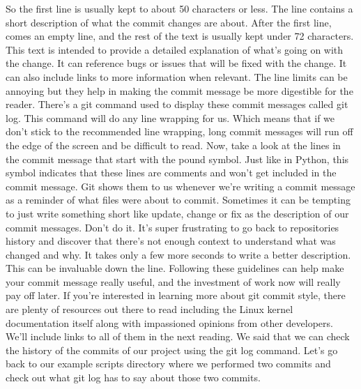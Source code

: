 	So the first line is usually kept to about 50 characters or less. The line contains a short description of what the commit changes are about. After the first line, comes an empty line, and the rest of the text is usually kept under 72 characters. This text is intended to provide a detailed explanation of what's going on with the change. It can reference bugs or issues that will be fixed with the change. It can also include links to more information when relevant. The line limits can be annoying but they help in making the commit message be more digestible for the reader. There's a git command used to display these commit messages called git log. This command will do any line wrapping for us. Which means that if we don't stick to the recommended line wrapping, long commit messages will run off the edge of the screen and be difficult to read. Now, take a look at the lines in the commit message that start with the pound symbol. Just like in Python, this symbol indicates that these lines are comments and won't get included in the commit message. Git shows them to us whenever we're writing a commit message as a reminder of what files were about to commit. Sometimes it can be tempting to just write something short like update, change or fix as the description of our commit messages. Don't do it. It's super frustrating to go back to repositories history and discover that there's not enough context to understand what was changed and why. It takes only a few more seconds to write a better description. This can be invaluable down the line. Following these guidelines can help make your commit message really useful, and the investment of work now will really pay off later. If you're interested in learning more about git commit style, there are plenty of resources out there to read including the Linux kernel documentation itself along with impassioned opinions from other developers. We'll include links to all of them in the next reading. We said that we can check the history of the commits of our project using the git log command. Let's go back to our example scripts directory where we performed two commits and check out what git log has to say about those two commits.
	
